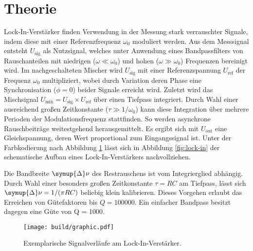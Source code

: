 \section{Theorie}
\label{sec:theorie}

Lock-In\hspace{0.1ex}-\hspace{-0.25ex}Verstärker finden Verwendung in der Messung stark
verrauschter Signale, indem diese mit einer Referenzfrequenz $\omega_0$ moduliert
werden. Aus dem Messsignal entsteht $U_{\! \text{sig}}$ als Nutzsignal, welches unter
Anwendung eines Bandpassfilters von Rauschanteilen mit niedrigen ($\omega\ll\omega_0$)
und hohen ($\omega\gg\omega_0$) Frequenzen bereinigt wird. Im nachgeschalteten Mischer
wird $U_{\! \text{sig}}$ mit einer Referenzspannung $U_{\! \text{ref}}$ der Frequenz
$\omega_0$ multipliziert, wobei durch Variation deren Phase eine Synchronisation
($\phi = 0$) beider Signale erreicht wird. Zuletzt wird das Mischsignal
$U_{\! \text{mix}} \! = U_{\! \text{sig}} \! \times U_{\! \text{ref}}$ über
einen Tiefpass integriert. Durch Wahl einer ausreichend großen Zeitkonstante
($\tau \gg 1/\omega_0$) kann diese Integration über mehrere Perioden der Modulationsfrequenz
stattfinden. So werden asynchrone Rauschbeiträge weitestgehend herausgemittelt. Es ergibt sich
mit $U_{\! \text{out}}$ eine Gleichspannung, deren Wert proportional zum Eingangssignal ist.
Unter der Farbkodierung nach Abbildung \ref{fig:verlauf} lässt sich in Abbildung \ref{fig:lock-in}
der schematische Aufbau eines Lock-In\hspace{0.1ex}-\hspace{-0.25ex}Verstärkers nachvollziehen.
\par
Die Bandbreite $\symup{\Delta}\nu$ des Restrauschens ist vom Integrierglied abhängig. Durch Wahl
einer besonders großen Zeitkonstante $\tau = RC$ am Tiefpass, lässt sich
$\symup{\Delta}\nu = 1/(\pi RC)$ beliebig klein kalibrieren.
Dieses Vorgehen erlaubt das Erreichen von Gütefaktoren bis $Q = \num{100000}$. Ein einfacher Bandpass
besitzt dagegen eine Güte von Q = \num{1000}.

\begin{figure}[H]
	\centering
	\texttt{[image: build/graphic.pdf]}
	\caption{Exemplarische Signalverläufe am Lock-In\hspace{0.1ex}-\hspace{-0.25ex}Verstärker.}
	\label{fig:verlauf}
\end{figure}

